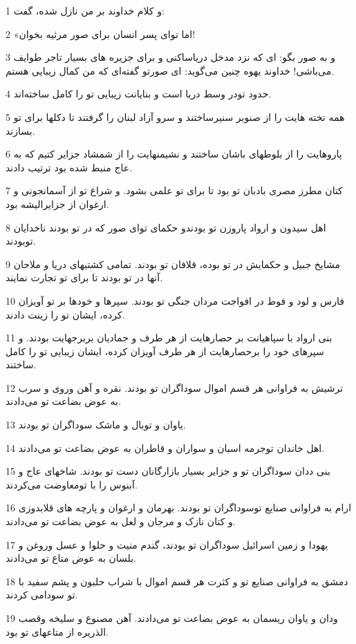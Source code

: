 \par 1 و کلام خداوند بر من نازل شده، گفت:
\par 2 «اما تو‌ای پسر انسان برای صور مرثیه بخوان!
\par 3 و به صور بگو: ای که نزد مدخل دریاساکنی و برای جزیره های بسیار تاجر طوایف می‌باشی! خداوند یهوه چنین می‌گوید: ای صورتو گفته‌ای که من کمال زیبایی هستم.
\par 4 حدود تودر وسط دریا است و بنایانت زیبایی تو را کامل ساخته‌اند.
\par 5 همه تخته هایت را از صنوبر سنیرساختند و سرو آزاد لبنان را گرفتند تا دکلها برای تو بسازند.
\par 6 پاروهایت را از بلوطهای باشان ساختند و نشیمنهایت را از شمشاد جزایر کتیم که به عاج منبط شده بود ترتیب دادند.
\par 7 کتان مطرز مصری بادبان تو بود تا برای تو علمی بشود. و شراع تو از آسمانجونی و ارغوان از جزایرالیشه بود.
\par 8 اهل سیدون و ارواد پاروزن تو بودندو حکمای تو‌ای صور که در تو بودند ناخدایان توبودند.
\par 9 مشایخ جبیل و حکمایش در تو بوده، قلافان تو بودند. تمامی کشتیهای دریا و ملاحان آنها در تو بودند تا برای تو تجارت نمایند.
\par 10 فارس و لود و فوط در افواجت مردان جنگی تو بودند. سپرها و خودها بر تو آویزان کرده، ایشان تو را زینت دادند.
\par 11 بنی ارواد با سپاهیانت بر حصارهایت از هر طرف و جمادیان بربرجهایت بودند. و سپرهای خود را برحصارهایت از هر طرف آویزان کرده، ایشان زیبایی تو را کامل ساختند.
\par 12 ترشیش به فراوانی هر قسم اموال سوداگران تو بودند. نقره و آهن وروی و سرب به عوض بضاعت تو می‌دادند.
\par 13 یاوان و توبال و ماشک سوداگران تو بودند.
\par 14 اهل خاندان توجرمه اسبان و سواران و قاطران به عوض بضاعت تو می‌دادند.
\par 15 بنی ددان سوداگران تو و جزایر بسیار بازارگانان دست تو بودند. شاخهای عاج و آبنوس را با تومعاوضت می‌کردند.
\par 16 ارام به فراوانی صنایع توسوداگران تو بودند. بهرمان و ارغوان و پارچه های قلابدوزی و کتان نازک و مرجان و لعل به عوض بضاعت تو می‌دادند.
\par 17 یهودا و زمین اسرائیل سوداگران تو بودند، گندم منیت و حلوا و عسل وروغن و بلسان به عوض متاع تو می‌دادند.
\par 18 دمشق به فراوانی صنایع تو و کثرت هر قسم اموال با شراب حلبون و پشم سفید با تو سودامی کردند.
\par 19 ودان و یاوان ریسمان به عوض بضاعت تو می‌دادند. آهن مصنوع و سلیخه وقصب الذریره از متاعهای تو بود.
